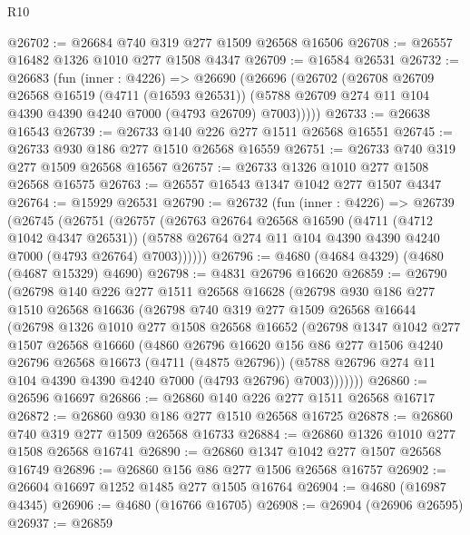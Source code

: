 \begin{lexlean}{R10}
\begin{coremodule}
@26702 := @26684 @740 @319 @277 @1509 @26568 @16506
@26708 := @26557 @16482 @1326 @1010 @277 @1508 @4347
@26709 := @16584 @26531
@26732 := @26683
    (fun (inner : @4226) =>
    @26690
      (@26696
        (@26702
          (@26708
            @26709
            @26568
            @16519
            (@4711 (@16593 @26531))
            (@5788 @26709 @274 @11 @104 @4390 @4390 @4240 @7000 (@4793 @26709) @7003)))))
@26733 := @26638 @16543
@26739 := @26733 @140 @226 @277 @1511 @26568 @16551
@26745 := @26733 @930 @186 @277 @1510 @26568 @16559
@26751 := @26733 @740 @319 @277 @1509 @26568 @16567
@26757 := @26733 @1326 @1010 @277 @1508 @26568 @16575
@26763 := @26557 @16543 @1347 @1042 @277 @1507 @4347
@26764 := @15929 @26531
@26790 := @26732
    (fun (inner : @4226) =>
    @26739
      (@26745
        (@26751
          (@26757
            (@26763
              @26764
              @26568
              @16590
              (@4711 (@4712 @1042 @4347 @26531))
              (@5788 @26764 @274 @11 @104 @4390 @4390 @4240 @7000 (@4793 @26764) @7003))))))
@26796 := @4680 (@4684 @4329) (@4680 (@4687 @15329) @4690)
@26798 := @4831 @26796 @16620
@26859 := @26790
    (@26798
      @140
      @226
      @277
      @1511
      @26568
      @16628
      (@26798
        @930
        @186
        @277
        @1510
        @26568
        @16636
        (@26798
          @740
          @319
          @277
          @1509
          @26568
          @16644
          (@26798
            @1326
            @1010
            @277
            @1508
            @26568
            @16652
            (@26798
              @1347
              @1042
              @277
              @1507
              @26568
              @16660
              (@4860
                @26796
                @16620
                @156
                @86
                @277
                @1506
                @4240
                @26796
                @26568
                @16673
                (@4711 (@4875 @26796))
                (@5788 @26796 @274 @11 @104 @4390 @4390 @4240 @7000 (@4793 @26796) @7003)))))))
@26860 := @26596 @16697
@26866 := @26860 @140 @226 @277 @1511 @26568 @16717
@26872 := @26860 @930 @186 @277 @1510 @26568 @16725
@26878 := @26860 @740 @319 @277 @1509 @26568 @16733
@26884 := @26860 @1326 @1010 @277 @1508 @26568 @16741
@26890 := @26860 @1347 @1042 @277 @1507 @26568 @16749
@26896 := @26860 @156 @86 @277 @1506 @26568 @16757
@26902 := @26604 @16697 @1252 @1485 @277 @1505 @16764
@26904 := @4680 (@16987 @4345)
@26906 := @4680 (@16766 @16705)
@26908 := @26904 (@26906 @26595)
@26937 := @26859

\end{coremodule}
\end{lexlean}
